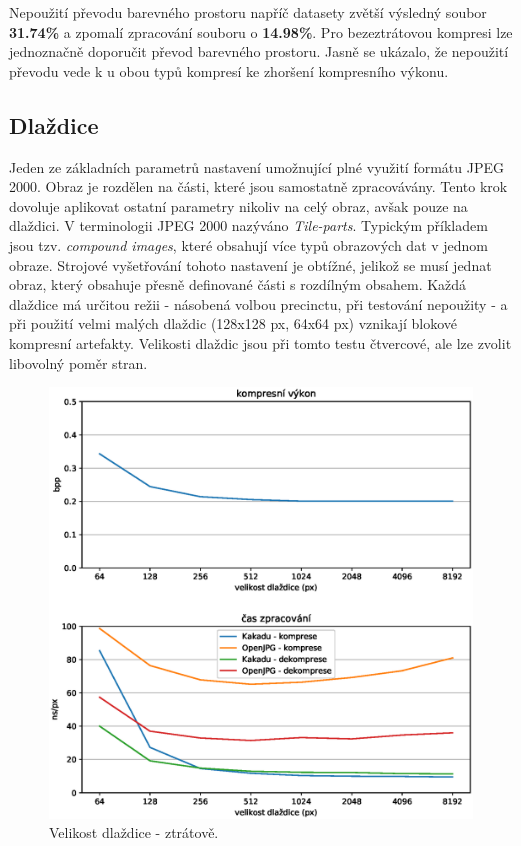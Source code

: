 \indent Nepoužití převodu barevného prostoru napříč datasety zvětší výsledný soubor \textbf{31.74\%} a zpomalí zpracování souboru o \textbf{14.98\%}. Pro bezeztrátovou kompresi lze jednoznačně doporučit převod barevného prostoru. Jasně se ukázalo, že nepoužití převodu vede k u obou typů kompresí ke zhoršení kompresního výkonu.

%
%
\newpage
\subsection*{Dlaždice}
Jeden ze základních parametrů nastavení umožnující plné využití formátu JPEG 2000. Obraz je rozdělen na části, které jsou samostatně zpracovávány. Tento krok dovoluje aplikovat ostatní parametry nikoliv na celý obraz, avšak pouze na dlaždici. V terminologii JPEG 2000 nazýváno \textit{Tile-parts}. Typickým příkladem jsou tzv. \textit{compound images}, které obsahují více typů obrazových dat v jednom obraze. Strojové vyšetřování tohoto nastavení je obtížné, jelikož se musí jednat obraz, který obsahuje přesně definované části s rozdílným obsahem.  Každá dlaždice má určitou režii - násobená volbou precinctu, při testování nepoužity - a při použití velmi malých dlaždic (128x128 px, 64x64 px) vznikají blokové kompresní artefakty. Velikosti dlaždic jsou při tomto testu čtvercové, ale lze zvolit libovolný poměr stran.

\begin{figure}[hbt!]
  \centering
  \hspace*{-0.75cm}
  \includegraphics[width=16cm]{obrazky-figures/tiles/fotky_tiles.eps}
  \caption{Velikost dlaždice - ztrátově.}
\end{figure}

